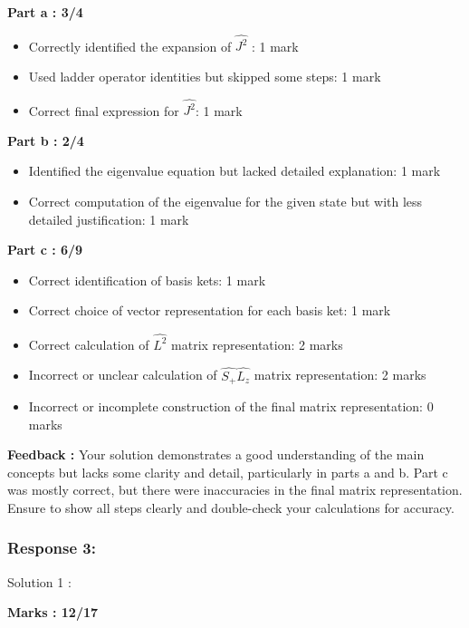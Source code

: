 \documentclass[a4paper,11pt]{article}
\begin{document}
\textbf{Part a : 3/4}

\begin{itemize}
    \item Correctly identified the expansion of $\hat{J^2}$ : 1 mark
    \item Used ladder operator identities but skipped some steps: 1 mark
    \item Correct final expression for $\hat{J^2}$: 1 mark
\end{itemize}


\textbf{Part b : 2/4}

\begin{itemize}
    \item Identified the eigenvalue equation but lacked detailed explanation: 1 mark
    \item Correct computation of the eigenvalue for the given state but with less detailed justification: 1 mark
\end{itemize}


\textbf{Part c : 6/9}

\begin{itemize}
    \item Correct identification of basis kets: 1 mark
    \item Correct choice of vector representation for each basis ket: 1 mark
    \item Correct calculation of $\hat{L^2}$ matrix representation: 2 marks
    \item Incorrect or unclear calculation of $\hat{S_+}\hat{L_z}$ matrix representation: 2 marks
    \item Incorrect or incomplete construction of the final matrix representation: 0 marks
\end{itemize}

\textbf{Feedback :}
Your solution demonstrates a good understanding of the main concepts but lacks some clarity and detail, particularly in parts a and b. Part c was mostly correct, but there were inaccuracies in the final matrix representation. Ensure to show all steps clearly and double-check your calculations for accuracy.



\subsubsection*{Response 3:}


Solution 1 :

\textbf{Marks : 12/17}
\end{document}

